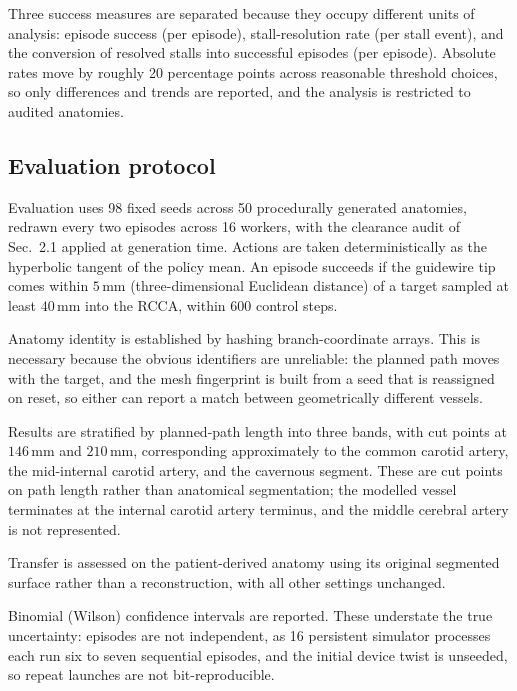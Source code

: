 Three success measures are separated because they occupy different units of analysis: episode
success (per episode), stall-resolution rate (per stall event), and the conversion of resolved
stalls into successful episodes (per episode). Absolute rates move by roughly 20 percentage
points across reasonable threshold choices, so only differences and trends are reported, and the
analysis is restricted to audited anatomies.

\subsection{Evaluation protocol}
\label{sec:eval}

Evaluation uses 98 fixed seeds across 50 procedurally generated anatomies, redrawn every two
episodes across 16 workers, with the clearance audit of Sec.~2.1 applied at generation time.
Actions are taken deterministically as the hyperbolic tangent of the policy mean. An episode
succeeds if the guidewire tip comes within $5$\,mm (three-dimensional Euclidean distance) of a
target sampled at least $40$\,mm into the RCCA, within 600 control steps.

Anatomy identity is established by hashing branch-coordinate arrays. This is necessary because
the obvious identifiers are unreliable: the planned path moves with the target, and the mesh
fingerprint is built from a seed that is reassigned on reset, so either can report a match
between geometrically different vessels.

Results are stratified by planned-path length into three bands, with cut points at $146$\,mm and
$210$\,mm, corresponding approximately to the common carotid artery, the mid-internal carotid
artery, and the cavernous segment. These are cut points on path length rather than anatomical
segmentation; the modelled vessel terminates at the internal carotid artery terminus, and the
middle cerebral artery is not represented.

Transfer is assessed on the patient-derived anatomy using its original segmented surface rather
than a reconstruction, with all other settings unchanged.

Binomial (Wilson) confidence intervals are reported. These understate the true uncertainty:
episodes are not independent, as 16 persistent simulator processes each run six to seven
sequential episodes, and the initial device twist is unseeded, so repeat launches are not
bit-reproducible.
